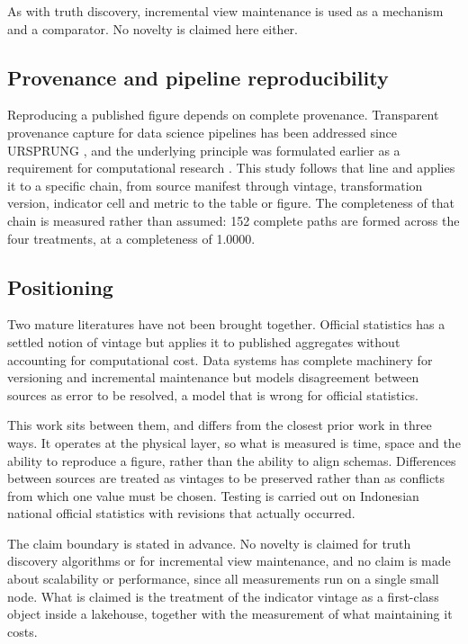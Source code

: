 \documentclass[a4paper,fleqn]{cas-dc}
\begin{document}
As with truth discovery, incremental view maintenance is used as a mechanism and
a comparator. No novelty is claimed here either.

\subsection{Provenance and pipeline reproducibility}

Reproducing a published figure depends on complete provenance. Transparent
provenance capture for data science pipelines has been addressed since URSPRUNG
\citep{rupprecht2020ursprung}, and the underlying principle was formulated
earlier as a requirement for computational research \citep{peng2011reproducible}.
This study follows that line and applies it to a specific chain, from source
manifest through vintage, transformation version, indicator cell and metric to
the table or figure. The completeness of that chain is measured rather than
assumed: 152 complete paths are formed across the four treatments, at a
completeness of 1.0000.

\subsection{Positioning}

Two mature literatures have not been brought together. Official statistics has a
settled notion of vintage but applies it to published aggregates without
accounting for computational cost. Data systems has complete machinery for
versioning and incremental maintenance but models disagreement between sources
as error to be resolved, a model that is wrong for official statistics.

This work sits between them, and differs from the closest prior work in three
ways. It operates at the physical layer, so what is measured is time, space and
the ability to reproduce a figure, rather than the ability to align schemas.
Differences between sources are treated as vintages to be preserved rather than
as conflicts from which one value must be chosen. Testing is carried out on
Indonesian national official statistics with revisions that actually occurred.

The claim boundary is stated in advance. No novelty is claimed for truth
discovery algorithms or for incremental view maintenance, and no claim is made
about scalability or performance, since all measurements run on a single small
node. What is claimed is the treatment of the indicator vintage as a first-class
object inside a lakehouse, together with the measurement of what maintaining it
costs.
\end{document}
